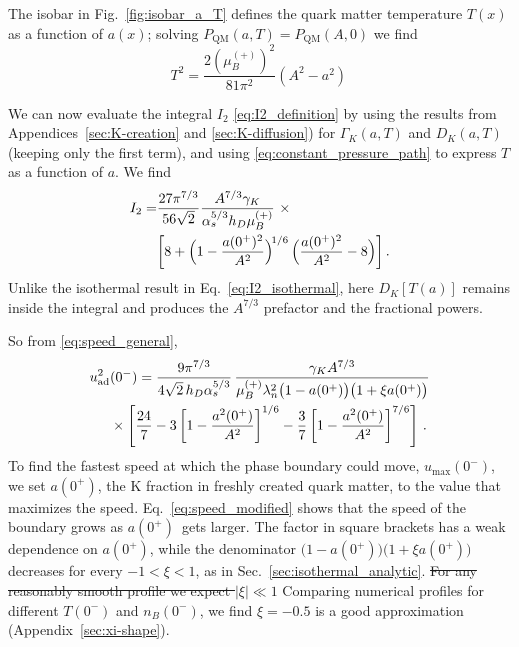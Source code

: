 \documentclass[10pt,superscriptaddress,
amsmath,aps,prc,twocolumn,nofootinbib,floatfix]{revtex4-1}
\newcommand{\old}[1]{{\color[rgb]{0.7,0.7,0.7}\sout{#1}}}
\newcommand{\JS}[1]{{\color{violet}#1}}
\newcommand{\al}{\alpha}
\newcommand{\ga}{\gamma}
\newcommand{\Ga}{\Gamma}
\newcommand{\Bratio}{\lambda_n}
\newcommand{\azp}{\ensuremath{a(0^+)}}
\begin{document}
The isobar in Fig.~\ref{fig:isobar_a_T} defines the quark matter temperature $T(x)$ as a function of $a(x)$; solving $P_\text{QM}(a,T)=P_\text{QM}(A,0)$ we find
\begin{equation}
 T^2=\frac{2(\mu_B^{(+)})^2}{81\pi^2}(A^2-a^2)\,
\label{eq:constant_pressure_path}
\end{equation}


We can now evaluate the integral $I_2$ \eqref{eq:I2_definition} by using the results from
Appendices~\ref{sec:K-creation} and \ref{sec:K-diffusion})
for $\Ga_K(a,T)$ and $D_K(a,T)$ (keeping only the first term), and using \eqref{eq:constant_pressure_path} to express $T$ as a function of $a$. We find
\begin{align}
 I_2 = &\dfrac{27 \pi^{7/3}}{56\sqrt{2}}
 \dfrac{A^{7/3}\ga_K}{\al_s^{5/3} h_D \mu_B^{(+)}}\ \times\notag \\
 &\biggl[ 8 + \Bigl(1-\dfrac{a(0^+)^2}{A^2}\Bigr)^{\!1/6}\,\Bigl(\dfrac{a(0^+)^2}{A^2} - 8\Bigr) \biggr] \,.
\end{align}
\JS{Unlike the isothermal result in Eq.~\eqref{eq:I2_isothermal}, here $D_K[T(a)]$ remains inside the integral and produces the $A^{7/3}$ prefactor and the fractional powers.}


%
So from \eqref{eq:speed_general},
\begin{align}
 u_{\rm ad}^2&(0^-)
 =
 \frac{9\pi^{7/3}}
 {4\sqrt{2}\,h_D\alpha_s^{5/3}}\,
 \frac{\gamma_K A^{7/3}}
 {\mu_B^{(+)} \Bratio^2
 \bigl(1-a(0^+)\bigr)\bigl(1+\xi a(0^+)\bigr)}
\notag\\
 &\times
 \left[
 \frac{24}{7}
 -3\left[1-\frac{a^2(0^+)}{A^2}\right]^{1/6}
 -\frac{3}{7}
 \left[1-\frac{a^2(0^+)}{A^2}\right]^{7/6}
 \right]\,.
\label{eq:speed_modified}
\end{align}
To find the fastest speed at which the phase boundary could move, $u_{\text{max}}(0^-)$, we set \azp, the K fraction in freshly created quark matter, to the value that maximizes the speed.
Eq.~\eqref{eq:speed_modified} shows that the speed of the boundary grows as \azp\ gets larger.
The factor in square brackets has a weak dependence on $a(0^+)$, while the denominator $\bigl(1-a(0^+)\bigr)\bigl(1+\xi a(0^+)\bigr)$ decreases for every $-1<\xi<1$, as in Sec.~\ref{sec:isothermal_analytic}.
\old{For any reasonably smooth profile we expect $|\xi|\ll 1$}
\JS{Comparing numerical profiles for different $T(0^-)$ and $n_B(0^-)$, we find $\xi=-0.5$ is a good approximation (Appendix~\ref{sec:xi-shape}).}
\end{document}
